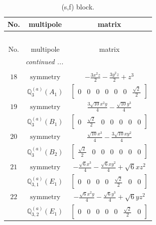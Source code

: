 \documentclass[fleqn,8pt,landscape]{jsarticle}
\begin{document}
\begin{longtable}{ccc}
\caption{(s,f) block.}
 \\
 \hline \hline
No. & multipole & matrix \\ \hline \endfirsthead

\multicolumn{2}{l}{\tablename\ \thetable{}} \\
 \hline \hline
No. & multipole & matrix \\ \hline \endhead

 \hline \hline
\multicolumn{2}{r}{\footnotesize\it continued ...} \\ \endfoot

 \hline \hline
\multicolumn{2}{r}{} \\ \endlastfoot

$ 18 $ & $ \text{symmetry} $ & $ - \frac{3 x^{2} z}{2} - \frac{3 y^{2} z}{2} + z^{3} $ \\
$  $ & $ \mathbb{Q}_{3}^{(a)}(A_{1}) $ & $ \begin{bmatrix} 0 & 0 & 0 & 0 & 0 & 0 & \frac{\sqrt{2}}{2} \end{bmatrix} $ \\ \hline
$ 19 $ & $ \text{symmetry} $ & $ \frac{3 \sqrt{10} x^{2} y}{4} - \frac{\sqrt{10} y^{3}}{4} $ \\
$  $ & $ \mathbb{Q}_{3}^{(a)}(B_{1}) $ & $ \begin{bmatrix} 0 & \frac{\sqrt{2}}{2} & 0 & 0 & 0 & 0 & 0 \end{bmatrix} $ \\ \hline
$ 20 $ & $ \text{symmetry} $ & $ \frac{\sqrt{10} x^{3}}{4} - \frac{3 \sqrt{10} x y^{2}}{4} $ \\
$  $ & $ \mathbb{Q}_{3}^{(a)}(B_{2}) $ & $ \begin{bmatrix} \frac{\sqrt{2}}{2} & 0 & 0 & 0 & 0 & 0 & 0 \end{bmatrix} $ \\ \hline
$ 21 $ & $ \text{symmetry} $ & $ - \frac{\sqrt{6} x^{3}}{4} - \frac{\sqrt{6} x y^{2}}{4} + \sqrt{6} x z^{2} $ \\
$  $ & $ \mathbb{Q}_{3,1}^{(a)}(E_{1}) $ & $ \begin{bmatrix} 0 & 0 & 0 & 0 & \frac{\sqrt{2}}{2} & 0 & 0 \end{bmatrix} $ \\ \hline
$ 22 $ & $ \text{symmetry} $ & $ - \frac{\sqrt{6} x^{2} y}{4} - \frac{\sqrt{6} y^{3}}{4} + \sqrt{6} y z^{2} $ \\
$  $ & $ \mathbb{Q}_{3,2}^{(a)}(E_{1}) $ & $ \begin{bmatrix} 0 & 0 & 0 & 0 & 0 & \frac{\sqrt{2}}{2} & 0 \end{bmatrix} $ \\ \hline

\end{longtable}
\end{document}
